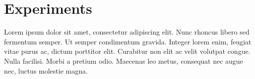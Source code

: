 \section{Experiments}
\label{sec:experiment}

Lorem ipsum dolor sit amet, consectetur adipiscing elit. Nunc rhoncus libero sed fermentum semper. Ut semper condimentum gravida. Integer lorem enim, feugiat vitae purus ac, dictum porttitor elit. Curabitur non elit ac velit volutpat congue. Nulla facilisi. Morbi a pretium odio. Maecenas leo metus, consequat nec augue nec, luctus molestie magna.
